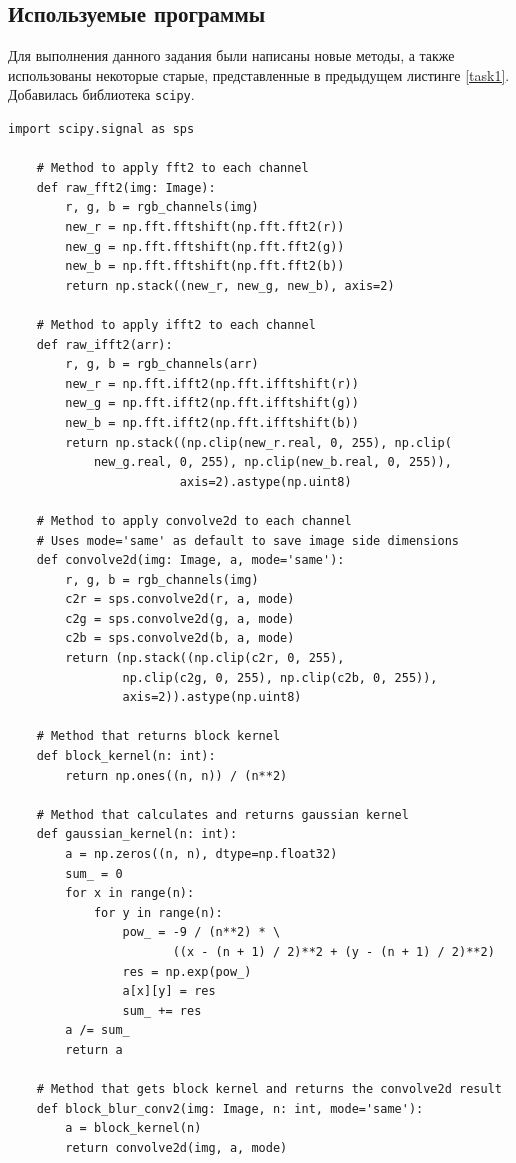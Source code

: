 \documentclass[a4paper, 12pt]{article}
\begin{document}
    \subsection{Используемые программы}
    Для выполнения данного задания были написаны новые методы, а также использованы
    некоторые старые, представленные в предыдущем листинге \ref{task1}. Добавилась библиотека \texttt{scipy}.
    \begin{lstlisting}[label=task2, caption={Программные методы, необходимые для задания 2}]
    import scipy.signal as sps

    # Method to apply fft2 to each channel
    def raw_fft2(img: Image):
        r, g, b = rgb_channels(img)
        new_r = np.fft.fftshift(np.fft.fft2(r))
        new_g = np.fft.fftshift(np.fft.fft2(g))
        new_b = np.fft.fftshift(np.fft.fft2(b))
        return np.stack((new_r, new_g, new_b), axis=2)

    # Method to apply ifft2 to each channel
    def raw_ifft2(arr):
        r, g, b = rgb_channels(arr)
        new_r = np.fft.ifft2(np.fft.ifftshift(r))
        new_g = np.fft.ifft2(np.fft.ifftshift(g))
        new_b = np.fft.ifft2(np.fft.ifftshift(b))
        return np.stack((np.clip(new_r.real, 0, 255), np.clip(
            new_g.real, 0, 255), np.clip(new_b.real, 0, 255)),
                        axis=2).astype(np.uint8)

    # Method to apply convolve2d to each channel
    # Uses mode='same' as default to save image side dimensions
    def convolve2d(img: Image, a, mode='same'):
        r, g, b = rgb_channels(img)
        c2r = sps.convolve2d(r, a, mode)
        c2g = sps.convolve2d(g, a, mode)
        c2b = sps.convolve2d(b, a, mode)
        return (np.stack((np.clip(c2r, 0, 255),
                np.clip(c2g, 0, 255), np.clip(c2b, 0, 255)),
                axis=2)).astype(np.uint8)

    # Method that returns block kernel
    def block_kernel(n: int):
        return np.ones((n, n)) / (n**2)

    # Method that calculates and returns gaussian kernel
    def gaussian_kernel(n: int):
        a = np.zeros((n, n), dtype=np.float32)
        sum_ = 0
        for x in range(n):
            for y in range(n):
                pow_ = -9 / (n**2) * \
                       ((x - (n + 1) / 2)**2 + (y - (n + 1) / 2)**2)
                res = np.exp(pow_)
                a[x][y] = res
                sum_ += res
        a /= sum_
        return a

    # Method that gets block kernel and returns the convolve2d result
    def block_blur_conv2(img: Image, n: int, mode='same'):
        a = block_kernel(n)
        return convolve2d(img, a, mode)


\end{lstlisting}
\end{document}

